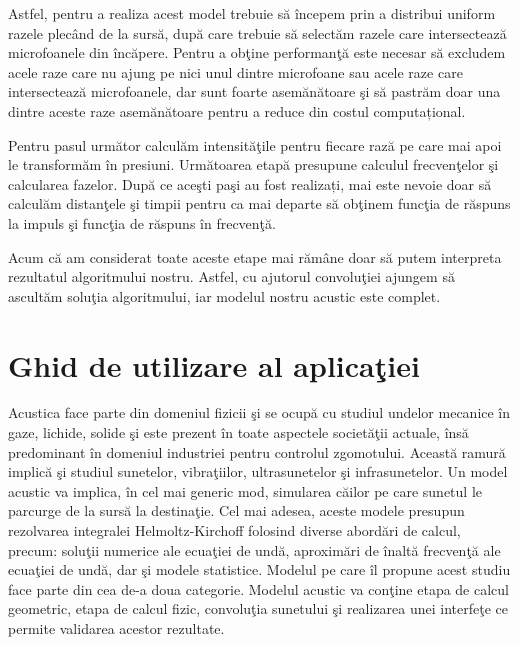 Astfel, pentru a realiza acest model trebuie s\u{a} \^{i}ncepem prin a distribui uniform razele plec\^{a}nd de la surs\u{a}, dup\u{a} care trebuie s\u{a} select\u{a}m razele care intersecteaz\u{a} microfoanele din \^{i}nc\u{a}pere. Pentru a ob\c{t}ine performan\c{t}\u{a} este necesar s\u{a} excludem acele raze care nu ajung pe nici unul dintre microfoane sau acele raze care intersecteaz\u{a} microfoanele, dar sunt foarte asem\u{a}n\u{a}toare \c{s}i s\u{a} pastr\u{a}m doar una dintre aceste raze asemănătoare pentru a reduce din costul computațional.

 
Pentru pasul urm\u{a}tor calcul\u{a}m intensit\u{a}\c{t}ile pentru fiecare raz\u{a} pe care mai apoi le transform\u{a}m \^{i}n presiuni. Urm\u{a}toarea etap\u{a} presupune calculul frecven\c{t}elor \c{s}i calcularea fazelor. Dup\u{a} ce ace\c{s}ti pa\c{s}i au fost realizați, mai este nevoie doar s\u{a} calcul\u{a}m distan\c{t}ele \c{s}i timpii pentru ca mai departe s\u{a} ob\c{t}inem func\c{t}ia de r\u{a}spuns la impuls \c{s}i func\c{t}ia de r\u{a}spuns în frecven\c{t}\u{a}.

  
Acum c\u{a} am considerat toate aceste etape mai rămâne doar s\u{a} putem interpreta rezultatul algoritmului nostru. Astfel, cu ajutorul convolu\c{t}iei ajungem s\u{a} ascult\u{a}m solu\c{t}ia algoritmului, iar modelul nostru acustic este complet.

\section{Ghid de utilizare al aplica\c{t}iei}

	Acustica face parte din domeniul fizicii \c{s}i se ocup\u{a} cu studiul undelor mecanice \^{i}n gaze, lichide, solide \c{s}i este prezent \^{i}n toate aspectele societ\u{a}\c{t}ii actuale, \^{i}ns\u{a} predominant \^{i}n domeniul industriei pentru controlul zgomotului. Aceast\u{a} ramur\u{a} implic\u{a} \c{s}i studiul sunetelor, vibra\c{t}iilor, ultrasunetelor \c{s}i infrasunetelor. Un model acustic va implica, \^{i}n cel mai generic mod, simularea c\u{a}ilor pe care sunetul le parcurge de la surs\u{a} la destina\c{t}ie. Cel mai adesea, aceste modele presupun rezolvarea integralei Helmoltz-Kirchoff \cite{helmoltz} folosind diverse abord\u{a}ri de calcul, precum: solu\c{t}ii numerice ale ecua\c{t}iei de und\u{a}, aproxim\u{a}ri de \^{i}nalt\u{a} frecven\c{t}\u{a} ale ecua\c{t}iei de und\u{a}, dar \c{s}i modele statistice. Modelul pe care \^{i}l propune acest studiu face parte din cea de-a doua categorie. Modelul acustic va con\c{t}ine etapa de calcul geometric, etapa de calcul fizic, convolu\c{t}ia sunetului \c{s}i realizarea unei interfe\c{t}e ce permite validarea acestor rezultate.
	 
